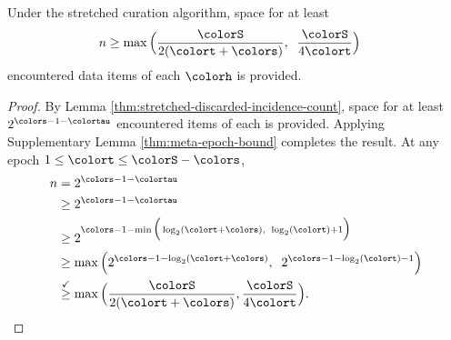 \begin{corollary}
\label{thm:stretched-reservation-count}
Under the stretched curation algorithm, space for at least
\begin{align*}
n &\geq
\max\Big(
  \frac{\colorS}{2(\colort + \colors)},\;\;
  \frac{\colorS}{4\colort}
\Big)
\end{align*}
encountered data items of each \hv{} $\colorh$ is provided.
\end{corollary}
\begin{proof}

By Lemma \ref{thm:stretched-discarded-incidence-count}, space for at least $2^{\colors - 1 - \colortau}$ encountered items of each \hv{} is provided.
Applying Supplementary Lemma \ref{thm:meta-epoch-bound} completes the result.
At any epoch $1 \leq \colort \leq \colorS - \colors$,
\begin{align*}
n
&= 2^{\colors - 1 - \colortau}\\
&\geq 2^{\colors - 1 - \colortau}\\
&\geq2^{\colors - 1 - \min\Big(
  \log_2(\colort + \colors),\;\;
  \log_2(\colort) + 1
\Big)}\\
&\geq \max\Big(
  2^{\colors - 1 - \log_2(\colort + \colors)},\;\;
  2^{\colors - 1 - \log_2(\colort) - 1}
\Big)\\
&\stackrel{\checkmark}{\geq} \max\Big(
  \frac{\colorS}{2(\colort + \colors)},
  \frac{\colorS}{4\colort}
\Big).
\end{align*}

\end{proof}
